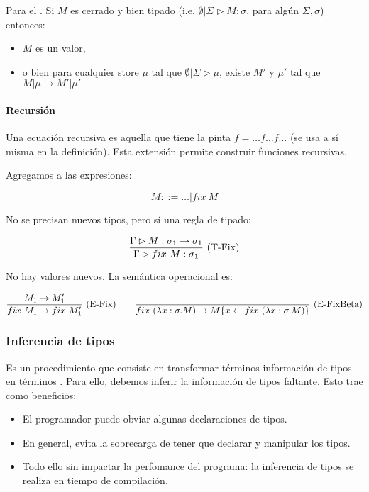 Para el . Si $M$ es cerrado y bien tipado (i.e. $\emptyset|\Sigma \rhd M : \sigma$, para algún $\Sigma, \sigma$) entonces:
\begin{itemize}
  \item $M$ es un valor,
  \item  o bien para cualquier store $\mu$ tal que $\emptyset|\Sigma \rhd \mu$, existe $M'$ y $\mu'$ tal que $M \vert \mu \to M' \vert \mu'$
\end{itemize}

\paragraph{Recursión}

Una ecuación recursiva es aquella que tiene la pinta $f = \dots f \dots f \dots$ (se usa a sí misma en la definición). Esta extensión permite construir funciones recursivas.

Agregamos a las expresiones:

\[M ::= \dots \vert fix\ M\]

No se precisan nuevos tipos, pero sí una regla de tipado:

\[\frac{\Gamma \rhd M : \sigma_1 \to \sigma_1}{\Gamma \rhd fix\ M : \sigma_1}\ \text{(T-Fix)}\]

No hay valores nuevos. La semántica operacional es:

\[\deriv{M_1 \to M_1'}{fix\ M_1 \to fix\ M_1'}{E-Fix}\quad\quad \deriv{}{fix\ (\abs{x}{\sigma}{M}) \to \sust{M}{x\from fix\  (\abs{x}{\sigma}{M})}}{E-FixBeta}\]

\subsubsection{Inferencia de tipos}

Es un procedimiento que consiste en transformar términos  información de tipos en términos . Para ello, debemos inferir la información de tipos faltante. Esto trae como beneficios:

\begin{itemize}
  \item El programador puede obviar algunas declaraciones de tipos.
  \item En general, evita la sobrecarga de tener que declarar y manipular  los tipos.
  \item Todo ello sin impactar la perfomance del programa: la inferencia de tipos se realiza en tiempo de compilación.
\end{itemize}

